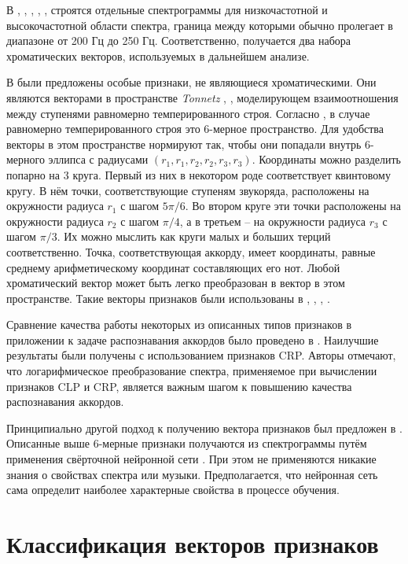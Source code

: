 В \cite{Mauch2008}, \cite{Mauch2009}, \cite{Khadkevich2011}, \cite{Ni2011},
\cite{DeHaas2012}, \cite{Chen2012} строятся отдельные спектрограммы для
низкочастотной и высокочастотной области спектра, граница между которыми обычно
пролегает в диапазоне от 200 Гц до 250 Гц. Соответственно, получается два
набора хроматических векторов, используемых в дальнейшем анализе.

В \cite{Harte2006} были предложены особые признаки, не являющиеся
хроматическими. Они являются векторами в пространстве \emph{Tonnetz}
\cite{Cohn1998}, \cite{Chew2000}, моделирующем взаимоотношения между ступенями
равномерно темперированного строя. Согласно \cite{Harte2006}, в случае
равномерно темперированного строя это 6-мерное пространство. Для удобства
векторы в этом пространстве нормируют так, чтобы они попадали внутрь 6-мерного
эллипса с радиусами $(r_1, r_1, r_2, r_2, r_3, r_3)$. Координаты можно разделить
попарно на 3 круга. Первый из них в некотором роде соответствует квинтовому
кругу. В нём точки, соответствующие ступеням звукоряда, расположены на
окружности радиуса $r_1$ с шагом $5\pi / 6$. Во втором круге эти точки
расположены на окружности радиуса $r_2$ с шагом $\pi/4$, а в третьем -- на
окружности радиуса $r_3$ с шагом $\pi/3$. Их можно мыслить как круги малых и
больших терций соответственно. Точка, соответствующая аккорду, имеет координаты,
равные среднему арифметическому координат составляющих его нот. Любой
хроматический вектор может быть легко преобразован в вектор в этом пространстве.
Такие векторы признаков были использованы в \cite{Lee2007}, \cite{Lee2008},
\cite{Chen2012}, \cite{Humphrey2012}.

Сравнение качества работы некоторых из описанных типов признаков в приложении к
задаче распознавания аккордов было проведено в \cite{Jiang2011}. Наилучшие
результаты были получены с использованием признаков CRP. Авторы отмечают, что
логарифмическое преобразование спектра, применяемое при вычислении признаков CLP
и CRP, является важным шагом к повышению качества распознавания аккордов.

Принципиально другой подход к получению вектора признаков был предложен в
\cite{Humphrey2012}. Описанные выше 6-мерные признаки получаются из
спектрограммы путём применения свёрточной нейронной сети \cite{LeCun1998}. При
этом не применяются никакие знания о свойствах спектра или музыки.
Предполагается, что нейронная сеть сама определит наиболее характерные свойства
в процессе обучения.

\section{Классификация векторов признаков} \label{sectL_post}

